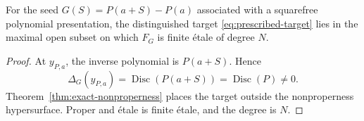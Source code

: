 \begin{corollary}
\label{cor:intrinsic-fullness}
For the seed \(G(S)=P(a+S)-P(a)\) associated with a squarefree
polynomial presentation, the distinguished target
\eqref{eq:prescribed-target} lies in the
maximal open subset on which \(F_G\) is finite \'etale of degree
\(N\).
\end{corollary}

\begin{proof}
At \(y_{P,a}\), the inverse polynomial is \(P(a+S)\).  Hence
\[
 \Delta_G(y_{P,a})=\operatorname{Disc}(P(a+S))
 =\operatorname{Disc}(P)\neq0.
\]
Theorem~\ref{thm:exact-nonproperness} places the target outside the
nonproperness hypersurface.  Proper and \'etale is finite \'etale, and the
degree is \(N\).
\end{proof}
